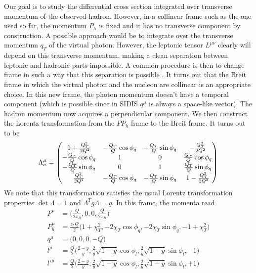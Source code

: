 Our goal is to study the differential cross section integrated over transverse momentum of the observed hadron. However, in a collinear frame such as the one used so far, the momentum $P_h$ is fixed and it has no transverse component by construction. A possible approach would be to integrate over the transverse momentum $q_T$ of the virtual photon. However, the leptonic tensor $L^{\mu\nu}$ clearly will depend on this transverse momentum, making a clean separation between leptonic and hadronic parts impossible. A common procedure is then to change frame in such a way that this separation is possible \cite{meng_semi-inclusive_1992,mulders_complete_1996, bacchetta_semi-inclusive_2007}. It turns out that the Breit frame in which the virtual photon and the nucleon are collinear is an appropriate choice. In this new frame, the photon momentum doesn't have a temporal component (which is possible since in SIDIS $q^\mu$ is always a space-like vector). The hadron momentum  now acquires a perpendicular component. We then construct the Lorentz transformation from the $PP_h$ frame to the Breit frame. It turns out to be
\begin{equation}
    \Lambda^\mu_\nu=\mqty(1+\frac{Q_T^2}{2Q^2} & -\frac{Q_T}{Q}\cos\phi_q & -\frac{Q_T}{Q}\sin\phi_q & -\frac{Q_T^2}{2Q^2}\\
    -\frac{Q_T}{Q}\cos\phi_q  & 1 & 0 & \frac{Q_T}{Q}\cos\phi_q \\
    -\frac{Q_T}{Q}\sin\phi_q  & 0 & 1 & \frac{Q_T}{Q}\sin\phi_q \\
    \frac{Q_T^2}{2Q^2} & -\frac{Q_T}{Q}\cos\phi_q & -\frac{Q_T}{Q}\sin\phi_q & 1-\frac{Q_T^2}{2Q^2}
    )
\end{equation}
We note that this transformation satisfies the usual Lorentz transformation properties $\det\Lambda=1$ and $\Lambda^T g \Lambda=g$. In this frame, the momenta read
\begin{equation}\label{eq:momenta in BF}
    \begin{aligned}
        P^\mu&=\Big(\frac{Q}{2x_B},0,0,\frac{Q}{2x_B}\Big)\\
        P_h^\mu&=\frac{z_hQ}{2}\Big(1+\chi_T^2,-2\chi_T\cos\phi_q,-2\chi_T\sin\phi_q,-1+\chi_T^2\Big)\\
        q^\mu&=\Big(0,0,0,-Q\Big)\\
        l^\mu&=\frac{Q}{2}\Big(\frac{2-y}{y},\frac{2}{y}\sqrt{1-y}\cos\phi_l, \frac{2}{y}\sqrt{1-y}\sin\phi_l,-1\Big)\\
        l'^\mu&=\frac{Q}{2}\Big(\frac{2-y}{y},\frac{2}{y}\sqrt{1-y}\cos\phi_l, \frac{2}{y}\sqrt{1-y}\sin\phi_l,+1\Big)
    \end{aligned}
\end{equation}
